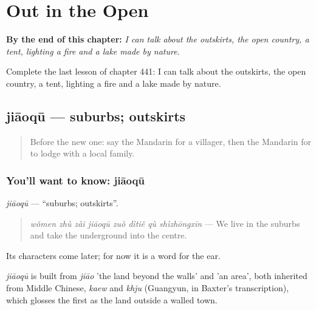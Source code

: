 
\chapter{Out in the Open}
\label{ch:zh-out-in-the-open}

\begin{chapteropening}
\textbf{By the end of this chapter:} \emph{I can talk about the outskirts, the open country, a tent, lighting a fire and a lake made by nature.}

Complete the last lesson of chapter 441: I can talk about the outskirts, the open country, a tent, lighting a fire and a lake made by nature.
\end{chapteropening}

\section[jiāoqū]{jiāoqū — suburbs; outskirts}

\label{lesson:ZH-C441-jiaoqu}



\begin{quote}
Before the new one: say the Mandarin for a villager, then the Mandarin for to lodge with a local family.
\end{quote}

\subsection*{You'll want to know: jiāoqū}
\emph{jiāoqū} — \textquotedblleft{}suburbs; outskirts\textquotedblright{}.

\begin{quote}
\emph{wǒmen zhù zài jiāoqū zuò dìtiě qù shìzhōngxīn} — We live in the suburbs and take the underground into the centre.
\end{quote}

Its characters come later; for now it is a word for the ear.

\begin{cousinweb}
\emph{jiāoqū} is built from \emph{jiāo} 'the land beyond the walls' and  'an area', both inherited from Middle Chinese, \emph{kaew} and \emph{khju} (Guangyun, in Baxter's transcription), which glosses the first as the land outside a walled town.
\end{cousinweb}

